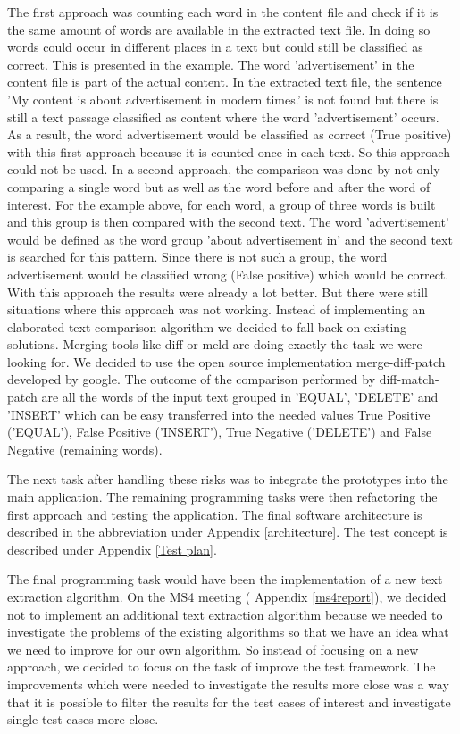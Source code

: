 The first approach was counting each word in the content file and check if it is the same amount of words are available in the extracted text file. In doing so words could occur in different places in a text but could still be classified as correct. This is presented in the example. The word 'advertisement' in the content file is part of the actual content. In the extracted text file, the sentence 'My content is about advertisement in modern times.' is not found but there is still a text passage classified as content where the word 'advertisement' occurs. As a result, the word advertisement would be classified as correct (True positive) with this first approach because it is counted once in each text. So this approach could not be used.
In a second approach, the comparison was done by not only comparing a single word but as well as the word before and after the word of interest. 
For the example above, for each word, a group of three words is built and this group is then compared with the second text. The word 'advertisement' would be defined as the word group 'about advertisement in' and the second text is searched for this pattern. Since there is not such a group, the word advertisement would be classified wrong (False positive) which would be correct. With this approach the results were already a lot better. But there were still situations where this approach was not working. Instead of implementing an elaborated text comparison algorithm we decided to fall back on existing solutions. Merging tools like diff \cite{wiki:diff} or meld \cite{wiki:meld} are doing exactly the task we were looking for. We decided to use the open source implementation merge-diff-patch \cite{google:diffMatchPatch} developed by google.  The outcome of the comparison performed by diff-match-patch are all the words of the input text grouped in 'EQUAL', 'DELETE' and 'INSERT' which can be easy transferred into the needed values True Positive ('EQUAL'), False Positive ('INSERT'), True Negative ('DELETE') and False Negative (remaining words). 


The next task after handling these risks was to integrate the prototypes into the main application. The remaining programming tasks were then refactoring the first approach and testing the application. The final software architecture is described in the abbreviation under Appendix \ref{architecture}. The test concept is described under Appendix \ref{Test plan}. 

The final programming task would have been the implementation of a new text extraction algorithm. On the MS4 meeting ( Appendix \ref{ms4report}), we decided not to implement an additional text extraction algorithm because we needed to investigate the problems of the existing algorithms so that we have an idea what we need to improve for our own algorithm. So instead of focusing on a new approach, we decided to focus on the task of improve the test framework. The improvements which were needed to investigate the results more close was a way that it is possible to filter the results for the test cases of interest and investigate single test cases more close. 

